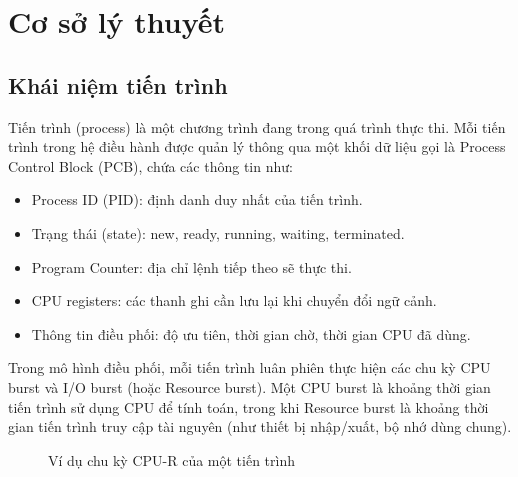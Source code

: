 \chapter{Cơ sở lý thuyết}

\section{Khái niệm tiến trình}

Tiến trình (process) là một chương trình đang trong quá trình thực thi. Mỗi tiến trình trong hệ điều hành được quản lý thông qua một khối dữ liệu gọi là Process Control Block (PCB), chứa các thông tin như:
\begin{itemize}
    \item Process ID (PID): định danh duy nhất của tiến trình.
    \item Trạng thái (state): new, ready, running, waiting, terminated.
    \item Program Counter: địa chỉ lệnh tiếp theo sẽ thực thi.
    \item CPU registers: các thanh ghi cần lưu lại khi chuyển đổi ngữ cảnh.
    \item Thông tin điều phối: độ ưu tiên, thời gian chờ, thời gian CPU đã dùng.
\end{itemize}

Trong mô hình điều phối, mỗi tiến trình luân phiên thực hiện các chu kỳ CPU burst và I/O burst (hoặc Resource burst). Một CPU burst là khoảng thời gian tiến trình sử dụng CPU để tính toán, trong khi Resource burst là khoảng thời gian tiến trình truy cập tài nguyên (như thiết bị nhập/xuất, bộ nhớ dùng chung).

\begin{figure}[h]
\centering
{}
\caption{Ví dụ chu kỳ CPU-R của một tiến trình}
\label{fig:cpu-r-cycle}
\end{figure}

